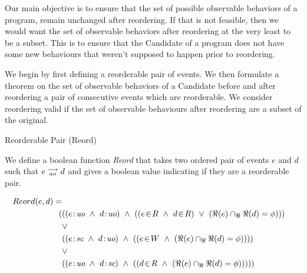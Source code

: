     Our main objective is to ensure that the set of possible observable behaviors of a program, remain unchanged after reordering. If that is not feasible, then we would want the set of observable behaviors after reordering at the very least to be a subset. This is to ensure that the Candidate of a program does not have some new behaviours that weren't supposed to happen prior to reordering. 
    
    We begin by first defining a reorderable pair of events. We then formulate a theorem on the set of observable behaviors of a Candidate before and after reordering a pair of consecutive events which are reorderable. We consider reordering valid if the set of observable behaviours after reordering are a subset of the original. 

    \begin{definition}{Reorderable Pair (Reord)}
        \label{Reord}
        
        We define a boolean function \emph{Reord} that takes two ordered pair of events $e$ and $d$ such that $e\stackrel{\longrightarrow}{_{ao}}d$ and gives a boolean value indicating if they are a reorderable pair. 
        
        \begin{align*}
            Reord(e,d) = \\
            (
            &((\et{e}{uo} \ \wedge \ \et{d}{uo}) \ \wedge \ 
                    (   
                        (\event{e}{R} \ \wedge \ \event{d}{R}) \ \vee \ 
                        (\Re(e) \cap_\Re \Re(d) = \phi) 
                    )
            ) \\ &\vee \\
            &((\et{e}{sc} \ \wedge \ \et{d}{uo}) \ \wedge \ 
                    (
                        (\event{e}{W} \ \wedge \ (\Re(e) \cap_\Re \Re(d) = \phi)) 
                    )
            ) \\ &\vee \\
            &((\et{e}{uo} \ \wedge \ \et{d}{sc}) \ \wedge \ 
                    (
                        (\event{d}{R} \ \wedge \ (\Re(e) \cap_\Re \Re(d) = \phi)) 
                    )
            )
            )
        \end{align*}

    \end{definition}

    

    

    

    

    
\subsection{}

    

    
    
    
    
    